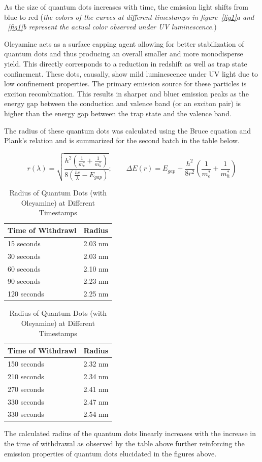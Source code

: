 \documentclass[journal=jacsat,manuscript=article]{achemso}
\begin{document}
As the size of quantum dots increases with time, the emission light shifts from blue to red (\textit{the colors of the curves at different timestamps in figure~\ref{fig1}a and ~\ref{fig1}b represent the actual color observed under UV luminescence.})

Oleyamine acts as a surface capping agent allowing for better stabilization of quantum dots and thus producing an overall smaller and more monodisperse yield\cite{Landry_Morrell_Karagounis_Hsia_Wang_2013}. This directly corresponds to a reduction in redshift as well as trap state confinement. These dots, causally, show mild luminescence under UV light due to low confinement properties. The primary emission source for these particles is exciton recombination. This results in sharper and bluer emission peaks as the energy gap between the conduction and valence band (or an exciton pair) is higher than the energy gap between the trap state and the valence band.

The radius of these quantum dots was calculated using the Bruce equation\cite{Modern_Vibrational} and Plank's relation and is summarized for the second batch in the table below.

\[r\left(\lambda \right)=\sqrt{\frac{h^{2}\left(\frac{1}{m_{e}^{*}}+\frac{1}{m_{h}^{*}}\right)}{8\left(\frac{hc}{\lambda }-E_{gap}\right)}}; \quad \quad \Delta E(r) = E_{gap} + \frac{h^{2}}{8r^{2}}\left(\frac{1}{m_{e}^{*}}+\frac{1}{m_{h}^{*}}\right)\]


\begin{table}
  \centering
  \begin{minipage}{0.5\textwidth}
    \centering
    \begin{tabular}{ll}
      \hline
      Time of Withdrawl & Radius  \\
      \hline
      15 seconds        & 2.03 nm \\
      30 seconds        & 2.03 nm \\
      60 seconds        & 2.10 nm \\
      90 seconds        & 2.23 nm \\
      120 seconds       & 2.25 nm \\
      \hline
    \end{tabular}
  \end{minipage}%
  \begin{minipage}{0.5\textwidth}
    \centering
    \begin{tabular}{ll}
      \hline
      Time of Withdrawl & Radius  \\
      \hline
      150 seconds       & 2.32 nm \\
      210 seconds       & 2.34 nm \\
      270 seconds       & 2.41 nm \\
      330 seconds       & 2.47 nm \\
      330 seconds       & 2.54 nm \\
      \hline
    \end{tabular}
  \end{minipage}
  \caption{Radius of Quantum Dots (with Oleyamine) at Different Timestamps}
\end{table}

The calculated radius of the quantum dots linearly increases with the increase in the time of withdrawal as observed by the table above further reinforcing the emission properties of quantum dots elucidated in the figures above.


\end{document}
